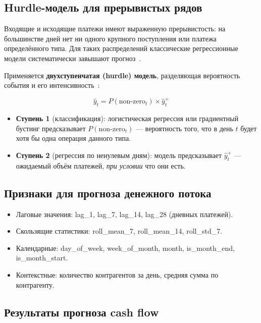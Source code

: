\subsection{Hurdle-модель для прерывистых рядов}

Входящие и исходящие платежи имеют выраженную прерывистость: на большинстве дней нет ни одного крупного поступления или платежа определённого типа. Для таких распределений классические регрессионные модели систематически завышают прогноз~\cite{lambert1992zero}.

Применяется \textbf{двухступенчатая (hurdle) модель}, разделяющая вероятность события и его интенсивность~\cite{lambert1992zero}:

\begin{equation}
\hat{y}_t = P(\text{non-zero}_t) \times \hat{y}^+_t
\end{equation}

\begin{itemize}
  \item \textbf{Ступень 1} (классификация): логистическая регрессия или градиентный бустинг предсказывает $P(\text{non-zero}_t)$ --- вероятность того, что в день $t$ будет хотя бы одна операция данного типа.
  \item \textbf{Ступень 2} (регрессия по ненулевым дням): модель предсказывает $\hat{y}^+_t$ --- ожидаемый объём платежей, \textit{при условии} что они есть.
\end{itemize}

\subsection{Признаки для прогноза денежного потока}

\begin{itemize}
  \item Лаговые значения: lag\_1, lag\_7, lag\_14, lag\_28 (дневных платежей).
  \item Скользящие статистики: roll\_mean\_7, roll\_mean\_14, roll\_std\_7.
  \item Календарные: day\_of\_week, week\_of\_month, month, is\_month\_end, is\_month\_start.
  \item Контекстные: количество контрагентов за день, средняя сумма по контрагенту.
\end{itemize}

\subsection{Результаты прогноза cash flow}

